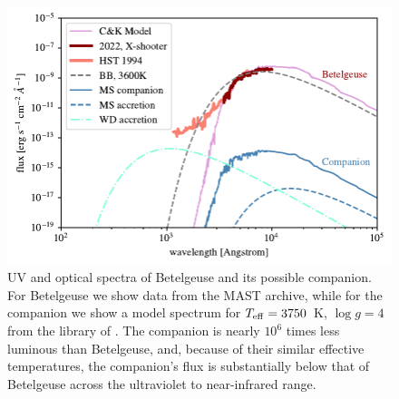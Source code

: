 \documentclass[twocolumn]{aastex631}
\begin{document}
\begin{figure}
    \centering
    \includegraphics[width=\linewidth]{figures/spectra_acc.pdf}
    \caption{UV and optical spectra of Betelgeuse and its possible companion. For Betelgeuse we show data from the MAST archive, while for the companion we show a model spectrum for $T_{\rm eff}=3750$~K, $\log g=4$ from the library of \citet{1997A&A...318..841C}. The companion is nearly $10^6$ times less luminous than Betelgeuse, and, because of their similar effective temperatures, the companion's flux is substantially below that of Betelgeuse across the ultraviolet to near-infrared range.  }
    \label{fig:spectra}
\end{figure}
\end{document}
